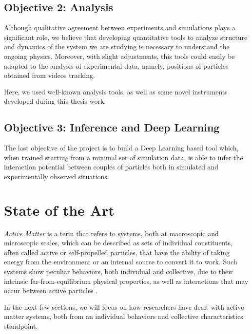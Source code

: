 \documentclass[../../master_thesis_np.tex]{subfiles}
\begin{document}
	\subsection{Objective 2: Analysis} %
	Although qualitative agreement between experiments and simulations plays a significant role, we believe that developing quantitative tools to analyze structure and dynamics of the system we are studying is necessary to understand the ongoing physics.
	Moreover, with slight adjustments, this tools could easily be adapted to the analysis of experimental data, namely, positions of particles obtained from videos tracking.
	
	Here, we used well-known analysis tools, as well as some novel instruments developed during this thesis work.
	
	\subsection{Objective 3: Inference and Deep Learning}
	The last objective of the project is to build a Deep Learning based tool which, when trained starting from a minimal set of simulation data, is able to infer the interaction potential between couples of particles both in simulated and experimentally observed situations.
	

	\section{State of the Art} \label{literature}
	
	\emph{Active Matter} is a term that refers to systems, both at macroscopic and microscopic scales, which can be described as sets of individual constituents, often called active or self-propelled particles, that have the ability of taking energy from the environment or an internal source to convert it to work. 
	Such systems show peculiar behaviors, both individual and collective, due to their intrinsic far-from-equilibrium physical properties, as well as interactions that may occur between active particles \cite{menon_active_2010, ramaswamy_active_2017}.
	
	In the next few sections, we will focus on how researchers have dealt with active matter systems, both from an individual behaviors and collective characteristics standpoint.
	
\end{document}
